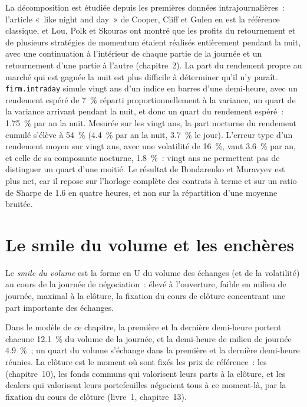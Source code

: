 La décomposition est étudiée depuis les premières données intrajournalières~: l'article «~like night and day~» de Cooper, Cliff et Gulen en est la référence classique, et Lou, Polk et
Skouras ont montré que les profits du retournement et de plusieurs stratégies de momentum étaient réalisés entièrement pendant la nuit, avec une continuation à l'intérieur de chaque partie de la journée
et un retournement d'une partie à l'autre (chapitre~2). La part du rendement propre au marché qui est gagnée la nuit est plus difficile à déterminer qu'il n'y paraît. \texttt{firm.intraday}
simule vingt ans d'un indice en barres d'une demi-heure, avec un rendement espéré de 7~\% réparti proportionnellement à la variance, un quart de la variance arrivant
pendant la nuit, et donc un quart du rendement espéré~: 1.75~\% par an la nuit. Mesurée sur les vingt ans, la part nocturne du rendement cumulé s'élève à
54~\% (4.4~\% par an la nuit, 3.7~\% le jour). L'erreur type d'un rendement moyen sur vingt ans, avec une volatilité de 16~\%, vaut 3.6~\% par an, et celle de sa composante
nocturne, 1.8~\%~: vingt ans ne permettent pas de distinguer un quart d'une moitié. Le résultat de Bondarenko et Muravyev est plus net, car il repose sur l'horloge complète des contrats à terme et
sur un ratio de Sharpe de 1.6 en quatre heures, et non sur la répartition d'une moyenne bruitée.

\section{Le smile du volume et les enchères}

\begin{definition}\label{def:s1:intraday-patterns:smile}
Le \emph{smile du volume} est la forme en U du volume des échanges (et de la volatilité) au cours de la journée de négociation~: élevé à l'ouverture, faible en milieu de
journée, maximal à la clôture, la fixation du cours de clôture concentrant une part importante des échanges.
\end{definition}

Dans le modèle de ce chapitre, la première et la dernière demi-heure portent chacune 12.1~\% du volume de la journée, et la demi-heure de milieu de journée 4.9~\%~; un quart du volume
s'échange dans la première et la dernière demi-heure réunies. La clôture est le moment où sont fixés les prix de référence~: les  (chapitre~10), les fonds communs qui valorisent leurs
parts à la clôture, et les dealers qui valorisent leurs portefeuilles négocient tous à ce moment-là, par la fixation du cours de clôture (livre~1, chapitre~13).

